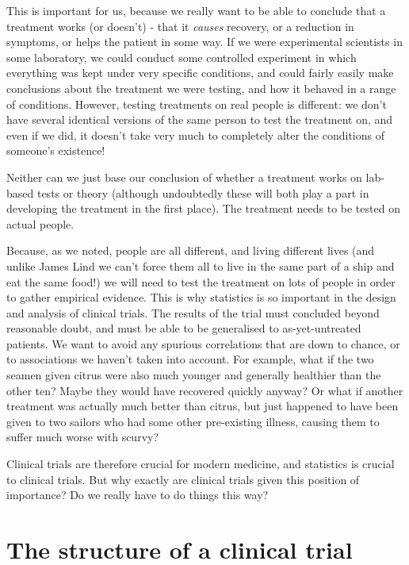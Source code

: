 \documentclass[
  openany]{book}
\theoremstyle{definition}
\theoremstyle{definition}
\theoremstyle{definition}
\theoremstyle{definition}
\theoremstyle{remark}
\begin{document}
This is important for us, because we really want to be able to conclude that a treatment works (or doesn't) - that it \emph{causes} recovery, or a reduction in symptoms, or helps the patient in some way.
If we were experimental scientists in some laboratory, we could conduct some controlled experiment in which everything was kept under very specific conditions, and could fairly easily make conclusions about the treatment we were testing, and how it behaved in a range of conditions. However, testing treatments on real people is different: we don't have several identical versions of the same person to test the treatment on, and even if we did, it doesn't take very much to completely alter the conditions of someone's existence!

Neither can we just base our conclusion of whether a treatment works on lab-based tests or theory (although undoubtedly these will both play a part in developing the treatment in the first place). The treatment needs to be tested on actual people.

Because, as we noted, people are all different, and living different lives (and unlike James Lind we can't force them all to live in the same part of a ship and eat the same food!) we will need to test the treatment on lots of people in order to gather empirical evidence. This is why statistics is so important in the design and analysis of clinical trials. The results of the trial must concluded beyond reasonable doubt, and must be able to be generalised to as-yet-untreated patients. We want to avoid any spurious correlations that are down to chance, or to associations we haven't taken into account. For example, what if the two seamen given citrus were also much younger and generally healthier than the other ten? Maybe they would have recovered quickly anyway? Or what if another treatment was actually much better than citrus, but just happened to have been given to two sailors who had some other pre-existing illness, causing them to suffer much worse with scurvy?

Clinical trials are therefore crucial for modern medicine, and statistics is crucial to clinical trials. But why exactly are clinical trials given this position of importance? Do we really have to do things this way?

\section{The structure of a clinical trial}\label{primout}
\end{document}
